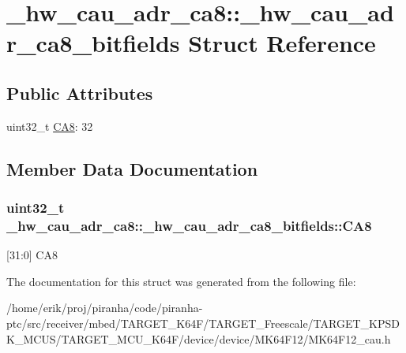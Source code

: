 \hypertarget{struct__hw__cau__adr__ca8_1_1__hw__cau__adr__ca8__bitfields}{}\section{\+\_\+hw\+\_\+cau\+\_\+adr\+\_\+ca8\+:\+:\+\_\+hw\+\_\+cau\+\_\+adr\+\_\+ca8\+\_\+bitfields Struct Reference}
\label{struct__hw__cau__adr__ca8_1_1__hw__cau__adr__ca8__bitfields}
\subsection*{Public Attributes}
\begin{DoxyCompactItemize}
\item 
uint32\+\_\+t \hyperlink{struct__hw__cau__adr__ca8_1_1__hw__cau__adr__ca8__bitfields_ae0c07b830d55d9fbe2a0b60be2fdce43}{C\+A8}\+: 32
\end{DoxyCompactItemize}


\subsection{Member Data Documentation}
\subsubsection[{\texorpdfstring{C\+A8}{CA8}}]{\setlength{\rightskip}{0pt plus 5cm}uint32\+\_\+t \+\_\+hw\+\_\+cau\+\_\+adr\+\_\+ca8\+::\+\_\+hw\+\_\+cau\+\_\+adr\+\_\+ca8\+\_\+bitfields\+::\+C\+A8}\hypertarget{struct__hw__cau__adr__ca8_1_1__hw__cau__adr__ca8__bitfields_ae0c07b830d55d9fbe2a0b60be2fdce43}{}\label{struct__hw__cau__adr__ca8_1_1__hw__cau__adr__ca8__bitfields_ae0c07b830d55d9fbe2a0b60be2fdce43}
\mbox{[}31\+:0\mbox{]} C\+A8 

The documentation for this struct was generated from the following file\+:\begin{DoxyCompactItemize}
\item 
/home/erik/proj/piranha/code/piranha-\/ptc/src/receiver/mbed/\+T\+A\+R\+G\+E\+T\+\_\+\+K64\+F/\+T\+A\+R\+G\+E\+T\+\_\+\+Freescale/\+T\+A\+R\+G\+E\+T\+\_\+\+K\+P\+S\+D\+K\+\_\+\+M\+C\+U\+S/\+T\+A\+R\+G\+E\+T\+\_\+\+M\+C\+U\+\_\+\+K64\+F/device/device/\+M\+K64\+F12/M\+K64\+F12\+\_\+cau.\+h\end{DoxyCompactItemize}
